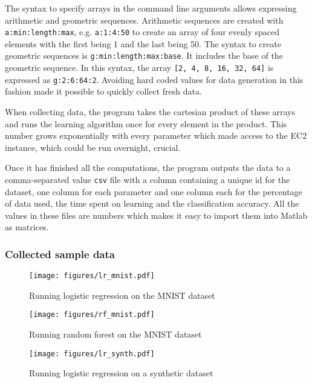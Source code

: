 \documentclass[a4paper,12pt,twoside,openright]{report}
\begin{document}
The syntax to specify arrays in the command line arguments allows expressing arithmetic and geometric sequences. Arithmetic sequences are created with \texttt{a:min:length:max}, e.g. \texttt{a:1:4:50} to create an array of four evenly spaced elements with the first being 1 and the last being 50. The syntax to create geometric sequences is \texttt{g:min:length:max:base}. It includes the base of the geometric sequence. In this syntax, the array \texttt{[2, 4, 8, 16, 32, 64]} is expressed as \texttt{g:2:6:64:2}. Avoiding hard coded values for data generation in this fashion made it possible to quickly collect fresh data.
	
When collecting data, the program takes the cartesian product of these arrays and runs the learning algorithm once for every element in the product. This number grows exponentially with every parameter which made access to the EC2 instance, which could be run overnight, crucial.

Once it has finished all the computations, the program outputs the data to a comma-separated value \texttt{csv} file with a column containing a unique id for the dataset, one column for each parameter and one column each for the percentage of data used, the time spent on learning and the classification accuracy. All the values in these files are numbers which makes it easy to import them into Matlab as matrices. 

\subsubsection{Collected sample data}

\begin{figure}
\centering
  \texttt{[image: figures/lr\_mnist.pdf]}
  \caption{Running logistic regression on the MNIST dataset}
  \label{sampledata1}
\end{figure}

\begin{figure}
\centering
  \texttt{[image: figures/rf\_mnist.pdf]}
  \caption{Running random forest on the MNIST dataset}
  \label{sampledata2}
\end{figure}

\begin{figure}
\centering
  \texttt{[image: figures/lr\_synth.pdf]}
  \caption{Running logistic regression on a synthetic dataset}
  \label{sampledata3}
\end{figure}
\end{document}
